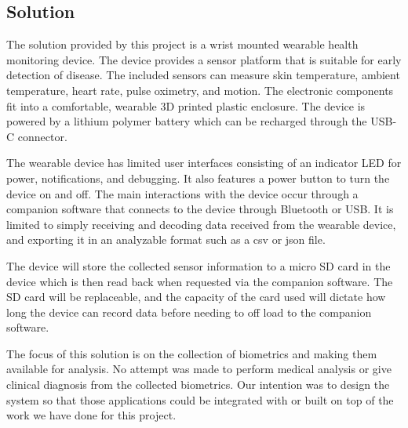\subsection{Solution}

The solution provided by this project is a wrist mounted wearable health 
monitoring device. The device provides a sensor platform that is suitable for 
early detection of disease. The included sensors can measure skin temperature, 
ambient temperature, heart rate, pulse oximetry, and motion.  The electronic
components fit into a comfortable, wearable 3D printed plastic enclosure.
The device is powered by a lithium polymer battery which can be recharged
through the USB-C connector.

The wearable device has limited user interfaces consisting of an indicator
LED for power, notifications, and debugging. It also features a power button
to turn the device on and off. The main interactions with the device occur 
through a companion software that connects to the device through Bluetooth or 
USB. It is limited to simply receiving and decoding data received from the 
wearable device, and exporting it in an analyzable format such as a csv or json 
file.

The device will store the collected sensor information to a micro SD card
in the device which is then read back when requested via the companion software.
The SD card will be replaceable, and the capacity of the card used will dictate
how long the device can record data before needing to off load to the companion
software.

The focus of this solution is on the collection of biometrics and making them
available for analysis. No attempt was made to perform medical analysis
or give clinical diagnosis from the collected biometrics. Our intention was to
design the system so that those applications could be integrated with or built
on top of the work we have done for this project.



